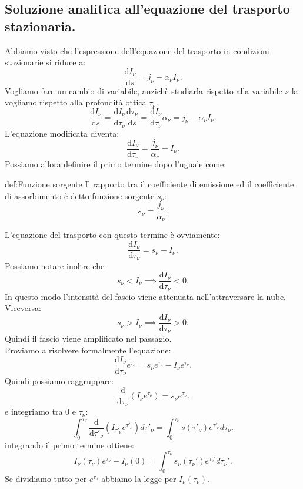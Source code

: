\subsection{Soluzione analitica all'equazione del trasporto stazionaria.}%
Abbiamo visto che l'espressione dell'equazione del trasporto in condizioni stazionarie si riduce a:
\[
	\frac{\mbox{d} I_{\nu}}{\mbox{d} s} = j _{\nu} - \alpha_{\nu}I_{\nu} 
.\] 
Vogliamo fare un cambio di variabile, anzichè studiarla rispetto alla variabile $s$ la vogliamo rispetto alla profondità ottica $\tau _{\nu} $.
\[
	\frac{\mbox{d} I_{\nu}}{\mbox{d} s} = \frac{\mbox{d} I_{\nu}}{\mbox{d} \tau_{\nu}} \frac{\mbox{d} \tau_{\nu}}{\mbox{d} s} = \frac{\mbox{d} I_{\nu}}{\mbox{d} \tau_{\nu}} \alpha_{\nu} = j _{\nu} - \alpha_{\nu}I_{\nu}
.\]
L'equazione modificata diventa:
\[
	\frac{\mbox{d} I_{\nu}}{\mbox{d} \tau_{\nu}}  = \frac{j _{\nu}}{\alpha_{\nu}}- I_{\nu}
.\] 
Possiamo allora definire il primo termine dopo l'uguale come:
\begin{defn}{def:Funzione sorgente}
	Il rapporto tra il coefficiente di emissione ed il coefficiente di assorbimento è detto funzione sorgente $s_{\nu} $:
	\[
		s_{\nu} = \frac{j _{\nu} }{\alpha _{\nu} }
	.\] 
\end{defn}
L'equazione del trasporto con questo termine è ovviamente:
\[
	\frac{\mbox{d} I_{\nu}}{\mbox{d} \tau_{\nu}} = s_{\nu}- I_{\nu}
.\] 
Possiamo notare inoltre che 
\[
s_{\nu}<I_{\nu} \implies \frac{\mbox{d} I_{\nu}}{\mbox{d} \tau_{\nu}} <0
.\]
In questo modo l'intensità del fascio viene attenuata nell'attraversare la nube. Viceversa:
\[
s_{\nu}>I_{\nu} \implies \frac{\mbox{d} I_{\nu}}{\mbox{d} \tau_{\nu}} >0
.\]
Quindi il fascio viene amplificato nel passagio.\\
Proviamo a risolvere formalmente l'equazione:
\[
	\frac{\mbox{d} I_{\nu}}{\mbox{d} \tau_{\nu}}e^{\tau_{\nu}} = s_{\nu}e^{\tau_{\nu}}- I_{\nu}e^{\tau_{\nu}}
.\] 
Quindi possiamo raggruppare:
\[
	\frac{\mbox{d} }{\mbox{d} \tau _{\nu} } \left( I_{\nu}e^{\tau_{\nu}} \right) = s_{\nu}e^{\tau_{\nu}}
.\] 
e integriamo tra 0 e $\tau _{\nu} $:
\[
	\int_{0}^{\tau_{\nu}}\frac{\mbox{d} }{\mbox{d} \tau'_{\nu}} \left( I_{\tau'_{\nu} } e^{\tau' _{\nu} } \right) d\tau '_{\nu}  = 
	\int_{0}^{\tau _{\nu} } s( \tau '_{\nu} ) e^{\tau '_{\nu} }d\tau _{\nu} 
.\] 
integrando il primo termine ottiene: 
\[
	I_{\nu}\left( \tau_{\nu} \right) e^{\tau_{\nu}} - I_{\nu}\left( 0 \right) = 
	\int_{0}^{\tau_{\nu}} s_{\nu}\left( \tau_{\nu}' \right) e^{\tau_{\nu}'}d \tau_{\nu}'
.\] 
Se dividiamo tutto per $e^{\tau _{\nu} }$ abbiamo la legge per $I_{\nu} ( \tau _{\nu} ) $.
